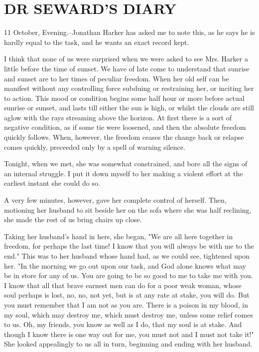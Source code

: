 \chapter{DR SEWARD'S DIARY}

11 October, Evening.--Jonathan Harker has asked me to note this, as he says he is hardly equal to the task, and he wants an exact record kept. 

I think that none of us were surprised when we were asked to see Mrs. Harker a little before the time of sunset. We have of late come to understand that sunrise and sunset are to her times of peculiar freedom. When her old self can be manifest without any controlling force subduing or restraining her, or inciting her to action. This mood or condition begins some half hour or more before actual sunrise or sunset, and lasts till either the sun is high, or whilst the clouds are still aglow with the rays streaming above the horizon. At first there is a sort of negative condition, as if some tie were loosened, and then the absolute freedom quickly follows. When, however, the freedom ceases the change back or relapse comes quickly, preceeded only by a spell of warning silence. 

Tonight, when we met, she was somewhat constrained, and bore all the signs of an internal struggle. I put it down myself to her making a violent effort at the earliest instant she could do so. 

A very few minutes, however, gave her complete control of herself. Then, motioning her husband to sit beside her on the sofa where she was half reclining, she made the rest of us bring chairs up close. 

Taking her husband's hand in hers, she began, "We are all here together in freedom, for perhaps the last time! I know that you will always be with me to the end." This was to her husband whose hand had, as we could see, tightened upon her. "In the morning we go out upon our task, and God alone knows what may be in store for any of us. You are going to be so good to me to take me with you. I know that all that brave earnest men can do for a poor weak woman, whose soul perhaps is lost, no, no, not yet, but is at any rate at stake, you will do. But you must remember that I am not as you are. There is a poison in my blood, in my soul, which may destroy me, which must destroy me, unless some relief comes to us. Oh, my friends, you know as well as I do, that my soul is at stake. And though I know there is one way out for me, you must not and I must not take it!" She looked appealingly to us all in turn, beginning and ending with her husband. 

